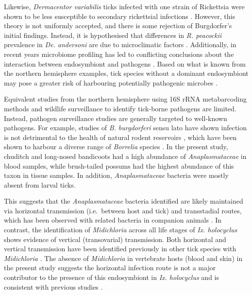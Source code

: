\documentclass[a4paper, nobind]{templates/ociamthesis}
\begin{document}
Likewise, \emph{Dermacentor variabilis} ticks infected with one strain of Rickettsia were shown to be less susceptible to secondary rickettsial infections \autocite{macalusoRickettsialInfectionDermacentor2002}.
However, this theory is not uniformly accepted, and there is some rejection of Burgdorfer's \autocite{burgdorferNonpathogenicRickettsiaeDermacentor1981} initial findings.
Instead, it is hypothesised that differences in \emph{R. peacockii} prevalence in \emph{De. andersoni} are due to microclimatic factors \autocite{telfordStatusEastSide2009}.
Additionally, in recent years microbiome profiling has led to conflicting conclusions about the interaction between endosymbiont and pathogens \autocite{bonnetUpdateIntricateTango2020}.
Based on what is known from the northern hemisphere examples, tick species without a dominant endosymbiont may pose a greater risk of harbouring potentially pathogenic microbes \autocite{bonnetUpdateIntricateTango2020}.

Equivalent studies from the northern hemisphere using 16S rRNA metabarcoding methods and wildlife surveillance to identify tick-borne pathogens are limited.
Instead, pathogen surveillance studies are generally targeted to well-known pathogens.
For example, studies of \emph{B. burgdorferi} sensu lato have shown infection is not detrimental to the health of natural rodent reservoirs \autocite{voordouwLymeDiseasePathogen2015}, which have been shown to harbour a diverse range of \emph{Borrelia} species \autocite{bunikisThirdBorreliaSpecies2005}.
In the present study, chuditch and long-nosed bandicoots had a high abundance of \emph{Anaplasmataceae} in blood samples, while brush-tailed possums had the highest abundance of this taxon in tissue samples.
In addition, \emph{Anaplasmataceae} bacteria were mostly absent from larval ticks.

This suggests that the \emph{Anaplasmataceae} bacteria identified are likely maintained via horizontal transmission (i.e.~between host and tick) and transstadial routes, which has been observed with related bacteria in companion animals \autocite{fourieTransmissionEhrlichiaCanis2013,almazanExperimentalIxodesRicinusSheep2020}.
In contrast, the identification of \emph{Midichloria} across all life stages of \emph{Ix. holocyclus} shows evidence of vertical (transovarial) transmission.
Both horizontal and vertical transmission have been identified previously in other tick species with \emph{Midichloria} \autocite{maricontiHumansParasitizedHard2012,serraMolecularSerologicalEvidence2018}.
The absence of \emph{Midichloria} in vertebrate hosts (blood and skin) in the present study suggests the horizontal infection route is not a major contributor to the presence of this endosymbiont in \emph{Ix. holocyclus} and is consistent with previous studies \autocite{mukhachevaBacteriaFamilyCandidatus2017}.
\end{document}
